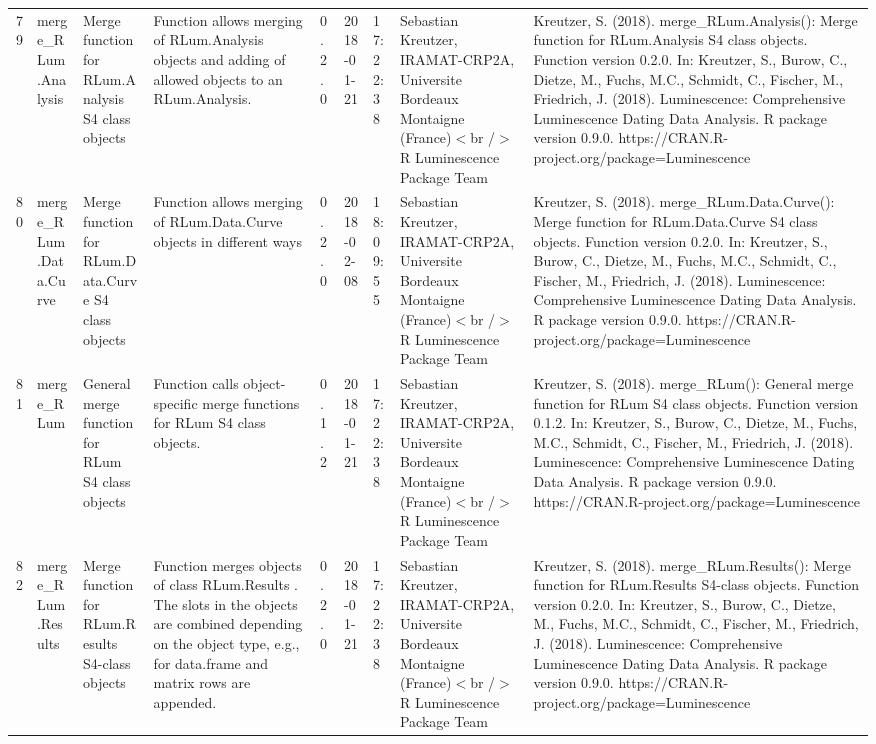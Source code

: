\begin{table}[ht]
\begin{tabular}{rllllllll}
 \\ 
  79 & merge\_RLum.Analysis & Merge function for RLum.Analysis S4 class objects & Function allows merging of RLum.Analysis objects and adding of allowed objects to an RLum.Analysis. & 0.2.0 & 2018-01-21 & 17:22:38
 & Sebastian Kreutzer, IRAMAT-CRP2A, Universite Bordeaux Montaigne (France)$<$br /$>$  R Luminescence Package Team & Kreutzer, S. (2018). merge\_RLum.Analysis(): Merge function for RLum.Analysis S4 class objects. Function version 0.2.0. In: Kreutzer, S., Burow, C., Dietze, M., Fuchs, M.C., Schmidt, C., Fischer, M., Friedrich, J. (2018). Luminescence: Comprehensive Luminescence Dating Data Analysis. R package version 0.9.0. https://CRAN.R-project.org/package=Luminescence
 \\ 
  80 & merge\_RLum.Data.Curve & Merge function for RLum.Data.Curve S4 class objects & Function allows merging of RLum.Data.Curve objects in different ways & 0.2.0 & 2018-02-08 & 18:09:55
 & Sebastian Kreutzer, IRAMAT-CRP2A, Universite Bordeaux Montaigne (France)$<$br /$>$  R Luminescence Package Team & Kreutzer, S. (2018). merge\_RLum.Data.Curve(): Merge function for RLum.Data.Curve S4 class objects. Function version 0.2.0. In: Kreutzer, S., Burow, C., Dietze, M., Fuchs, M.C., Schmidt, C., Fischer, M., Friedrich, J. (2018). Luminescence: Comprehensive Luminescence Dating Data Analysis. R package version 0.9.0. https://CRAN.R-project.org/package=Luminescence
 \\ 
  81 & merge\_RLum & General merge function for RLum S4 class objects & Function calls object-specific merge functions for RLum S4 class objects. & 0.1.2 & 2018-01-21 & 17:22:38
 & Sebastian Kreutzer, IRAMAT-CRP2A, Universite Bordeaux Montaigne (France)$<$br /$>$  R Luminescence Package Team & Kreutzer, S. (2018). merge\_RLum(): General merge function for RLum S4 class objects. Function version 0.1.2. In: Kreutzer, S., Burow, C., Dietze, M., Fuchs, M.C., Schmidt, C., Fischer, M., Friedrich, J. (2018). Luminescence: Comprehensive Luminescence Dating Data Analysis. R package version 0.9.0. https://CRAN.R-project.org/package=Luminescence
 \\ 
  82 & merge\_RLum.Results & Merge function for RLum.Results S4-class objects & Function merges objects of class  RLum.Results . The slots in the objects are combined depending on the object type, e.g., for  data.frame  and  matrix  rows are appended. & 0.2.0 & 2018-01-21 & 17:22:38
 & Sebastian Kreutzer, IRAMAT-CRP2A, Universite Bordeaux Montaigne (France)$<$br /$>$  R Luminescence Package Team & Kreutzer, S. (2018). merge\_RLum.Results(): Merge function for RLum.Results S4-class objects. Function version 0.2.0. In: Kreutzer, S., Burow, C., Dietze, M., Fuchs, M.C., Schmidt, C., Fischer, M., Friedrich, J. (2018). Luminescence: Comprehensive Luminescence Dating Data Analysis. R package version 0.9.0. https://CRAN.R-project.org/package=Luminescence

\end{tabular}
\end{table}
